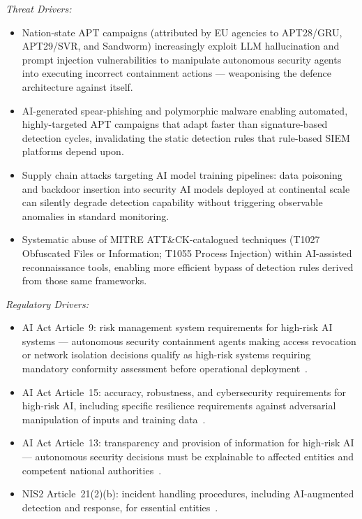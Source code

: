 \begin{enumerate}
\textit{Threat Drivers:}
\begin{itemize}
  \item Nation-state APT campaigns (attributed by EU agencies to APT28/GRU,
        APT29/SVR, and Sandworm) increasingly exploit LLM hallucination and
        prompt injection vulnerabilities to manipulate autonomous security agents
        into executing incorrect containment actions --- weaponising the defence
        architecture against itself.
  \item AI-generated spear-phishing and poly\-morphic malware
        enabling automated, highly-targeted APT campaigns that adapt
        faster than signature-based
        detection cycles, invalidating the static detection rules that rule-based
        SIEM platforms depend upon.
  \item Supply chain attacks targeting AI model training pipelines: data poisoning
        and backdoor insertion into security AI models deployed at continental scale
        can silently degrade detection capability without triggering observable
        anomalies in standard monitoring.
  \item Systematic abuse of MITRE ATT\&CK-catalogued techniques (T1027 Obfuscated
        Files or Information; T1055 Process Injection) within AI-assisted
        reconnaissance tools, enabling more efficient bypass of detection rules
        derived from those same frameworks.
\end{itemize}

\textit{Regulatory Drivers:}
\begin{itemize}
  \item AI Act Article~9: risk management system requirements for high-risk AI
        systems --- autonomous security containment agents making access revocation
        or network isolation decisions qualify as high-risk systems requiring
        mandatory conformity assessment before operational deployment~\cite{aiact}.
  \item AI Act Article~15: accuracy, robustness, and cybersecurity requirements
        for high-risk AI, including specific resilience requirements against
        adversarial manipulation of inputs and training data~\cite{aiact}.
  \item AI Act Article~13: transparency and provision of information for high-risk
        AI --- autonomous security decisions must be explainable to affected
        entities and competent national authorities~\cite{aiact}.
  \item NIS2 Article~21(2)(b): incident handling procedures, including
        AI-augmented detection and response, for essential entities~\cite{nis2}.
\end{itemize}


\end{enumerate}
